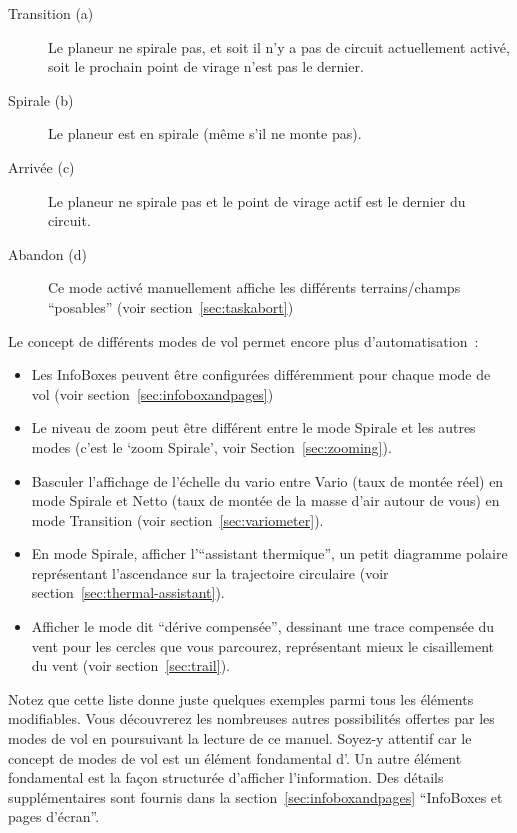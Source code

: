 \begin{description}
\item[Transition (a)] Le planeur ne spirale pas, et soit il n'y a pas de circuit actuellement activé, soit le prochain point de virage n'est pas le dernier.
\item[Spirale (b)] Le planeur est en spirale (même s'il ne monte pas).
\item[Arrivée (c)] Le planeur ne spirale pas et le point de virage actif est le dernier du circuit.
\item[Abandon (d)] Ce mode activé manuellement affiche les différents terrains/champs ``posables'' (voir section~\ref{sec:taskabort})
\end{description}

Le concept de différents modes de vol permet encore plus d'automatisation~:
\begin{itemize}
\item {} Les InfoBoxes peuvent être configurées différemment pour chaque mode de vol (voir section~\ref{sec:infoboxandpages})
\item {} Le niveau de zoom peut être différent entre le mode Spirale et les autres modes (c'est le `zoom Spirale', voir Section~\ref{sec:zooming}).
\item {} Basculer l'affichage de l'échelle du vario entre Vario (taux de montée réel) en mode Spirale et Netto (taux de montée de la masse d'air autour de vous) en mode Transition (voir section~\ref{sec:variometer}).
\item {} En mode Spirale, afficher l'``assistant thermique'', un petit diagramme polaire représentant l'ascendance sur la trajectoire circulaire (voir section~\ref{sec:thermal-assistant}).
\item {} Afficher le mode dit ``dérive compensée'', dessinant une trace compensée du vent pour les cercles que vous parcourez, représentant mieux le cisaillement du vent (voir section~\ref{sec:trail}).\end{itemize}

Notez que cette liste donne juste quelques exemples parmi tous les éléments modifiables.
Vous découvrerez les nombreuses autres possibilités offertes par les modes de vol en poursuivant la lecture de ce manuel.
Soyez-y attentif car le concept de modes de vol est un élément fondamental d'\xc.
Un autre élément fondamental est la façon structurée d'afficher l'information.
Des détails supplémentaires sont fournis dans la section~\ref{sec:infoboxandpages} ``InfoBoxes et pages d'écran''.


